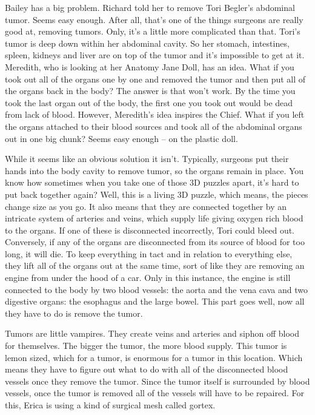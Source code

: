 \documentclass[12pt,a4paper,onecolumn]{article}
\begin{document}
Bailey has a big problem. Richard told her to remove Tori Begler's abdominal tumor. Seems easy
enough. After all, that's one of the things surgeons are really good at, removing tumors. Only, it's
a little more complicated than that. Tori's tumor is deep down within her abdominal
cavity\cite{cavity}. So her stomach, intestines\cite{intestine}, spleen\cite{spleen}, kidneys and
liver are on top of the tumor and it's impossible to get at it. Meredith, who is looking at her
Anatomy Jane Doll, has an idea. What if you took out all of the organs one by one and removed the
tumor and then put all of the organs back in the body? The answer is that won't work. By the time
you took the last organ out of the body, the first one you took out would be dead from lack of
blood. However, Meredith's idea inspires the Chief. What if you left the organs attached to their
blood sources and took all of the abdominal organs out in one big chunk? Seems easy enough -- on the
plastic doll.

While it seems like an obvious solution it isn't. Typically, surgeons put their hands into the body
cavity to remove tumor, so the organs remain in place. You know how sometimes when you take one of
those 3D puzzles apart, it's hard to put back together again? Well, this is a living 3D puzzle,
which means, the pieces change size as you go. It also means that they are connected together by an
intricate\cite{intricate} system of arteries and veins, which supply life giving oxygen rich blood
to the organs. If one of these is disconnected incorrectly, Tori could bleed out. Conversely, if any
of the organs are disconnected from its source of blood for too long, it will die. To keep
everything in tact and in relation to everything else, they lift all of the organs out at the same
time, sort of like they are removing an engine from under the hood\cite{hood} of a car. Only in this
instance, the engine is still connected to the body by two blood vessels: the aorta\cite{aorta} and
the vena\cite{vena} cava and two digestive organs: the esophagus\cite{esophagus} and the large
bowel\cite{bowel}. This part goes well, now all they have to do is remove the tumor.

Tumors are little vampires\cite{vampire}. They create veins and arteries and siphon\cite{siphon} off
blood for themselves. The bigger the tumor, the more blood supply. This tumor is lemon sized, which
for a tumor, is enormous for a tumor in this location. Which means they have to figure out what to
do with all of the disconnected blood vessels once they remove the tumor. Since the tumor itself is
surrounded by blood vessels, once the tumor is removed all of the vessels will have to be repaired.
For this, Erica is using a kind of surgical mesh called gortex.
\end{document}
